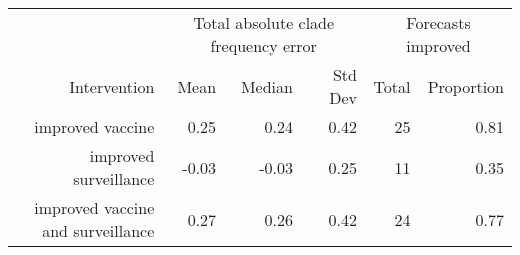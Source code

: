 
\begin{tabular*}{1.0\textwidth}{rrrrrr}
\toprule
             & \multicolumn{3}{c}{Total absolute clade frequency error} & \multicolumn{2}{c}{Forecasts improved} \\
Intervention & Mean & Median & Std Dev & Total & Proportion \\
\midrule

improved vaccine & 0.25 & 0.24 & 0.42 & 25 & 0.81 \\
improved surveillance & -0.03 & -0.03 & 0.25 & 11 & 0.35 \\
improved vaccine and surveillance & 0.27 & 0.26 & 0.42 & 24 & 0.77 \\

\bottomrule
\end{tabular*}

